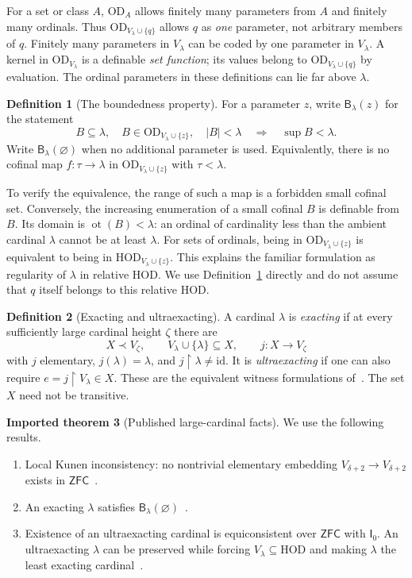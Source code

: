 \documentclass[11pt,letterpaper]{article}
\theoremstyle{definition}
\newtheorem{definition}{Definition}[section]
\newtheorem{inputtheorem}[definition]{Imported theorem}
\newcommand{\ZFC}{\mathsf{ZFC}}
\newcommand{\OD}{\mathrm{OD}}
\newcommand{\HOD}{\mathrm{HOD}}
\newcommand{\ot}{\operatorname{ot}}
\newcommand{\id}{\mathrm{id}}
\newcommand{\restr}{\mathbin{\upharpoonright}}
\newcommand{\Izero}{\mathsf I_0}
\newcommand{\Blam}[1]{\mathsf B_\lambda(#1)}
\newcommand{\ODlam}{\OD_{V_\lambda}}
\newcommand{\ODq}{\OD_{V_\lambda\cup\{q\}}}
\newcommand{\ODz}{\OD_{V_\lambda\cup\{z\}}}
\begin{document}
For a set or class $A$, $\OD_A$ allows finitely many parameters from $A$ and finitely many ordinals. Thus $\ODq$ allows $q$ as \emph{one} parameter, not arbitrary members of $q$. Finitely many parameters in $V_\lambda$ can be coded by one parameter in $V_\lambda$. A kernel in $\ODlam$ is a definable \emph{set function}; its values belong to $\ODq$ by evaluation. The ordinal parameters in these definitions can lie far above $\lambda$.

\begin{definition}[The boundedness property]\label{def:bounded}
For a parameter $z$, write $\Blam z$ for the statement
\[
 B\subseteq\lambda,
 \quad B\in\ODz,
 \quad |B|<\lambda
 \quad\Longrightarrow\quad \sup B<\lambda.
\]
Write $\Blam\varnothing$ when no additional parameter is used. Equivalently, there is no cofinal map $f:\tau\to\lambda$ in $\ODz$ with $\tau<\lambda$.
\end{definition}

To verify the equivalence, the range of such a map is a forbidden small cofinal set. Conversely, the increasing enumeration of a small cofinal $B$ is definable from $B$. Its domain is $\ot(B)<\lambda$: an ordinal of cardinality less than the ambient cardinal $\lambda$ cannot be at least $\lambda$. For sets of ordinals, being in $\ODz$ is equivalent to being in $\HOD_{V_\lambda\cup\{z\}}$. This explains the familiar formulation as regularity of $\lambda$ in relative HOD. We use Definition~\ref{def:bounded} directly and do not assume that $q$ itself belongs to this relative HOD.

\begin{definition}[Exacting and ultraexacting]
A cardinal $\lambda$ is \emph{exacting} if at every sufficiently large cardinal height $\zeta$ there are
\[
 X\prec V_\zeta,\qquad V_\lambda\cup\{\lambda\}\subseteq X,
 \qquad j:X\longrightarrow V_\zeta
\]
with $j$ elementary, $j(\lambda)=\lambda$, and $j\restr\lambda\ne\id$. It is \emph{ultraexacting} if one can also require $e=j\restr V_\lambda\in X$. These are the equivalent witness formulations of~\cite[Definitions 2.1--2.3 and Proposition 2.4]{abgl}. The set $X$ need not be transitive.
\end{definition}

\begin{inputtheorem}[Published large-cardinal facts]\label{in:published}
We use the following results.
\begin{enumerate}
\item Local Kunen inconsistency: no nontrivial elementary embedding $V_{\delta+2}\to V_{\delta+2}$ exists in $\ZFC$~\cite{kunen,hkp}.
\item An exacting $\lambda$ satisfies $\Blam\varnothing$~\cite[Theorem 2.10]{abl}.
\item Existence of an ultraexacting cardinal is equiconsistent over $\ZFC$ with $\Izero$. An ultraexacting $\lambda$ can be preserved while forcing $V_\lambda\subseteq\HOD$ and making $\lambda$ the least exacting cardinal~\cite[Theorem 4.5, Proposition 3.9, Corollary 3.10]{abgl}.
\end{enumerate}
\end{inputtheorem}
\end{document}
